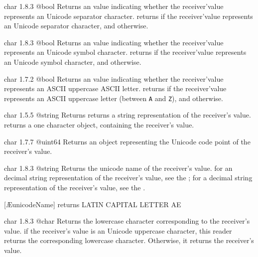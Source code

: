 {char}
{1.8.3}
{@bool}
{Returns an  value indicating whether the receiver'value represents an Unicode separator character.}
{returns  if the receiver'value represents an Unicode separator character, and  otherwise.}






{char}
{1.8.3}
{@bool}
{Returns an  value indicating whether the receiver'value represents an Unicode symbol character.}
{returns  if the receiver'value represents an Unicode symbol character, and  otherwise.}









{char}
{1.7.2}
{@bool}
{Returns an  value indicating whether the receiver'value represents an ASCII uppercase ASCII letter.}
{returns  if the receiver'value represents an ASCII uppercase letter (between \texttt{\textquotesingle A\textquotesingle} and \texttt{\textquotesingle Z\textquotesingle}), and  otherwise.}





{char}
{1.5.5}
{@string}
{Returns returns a string representation of the receiver's value.}
{returns a one character  object, containing the receiver's value.}




{char}
{1.7.7}
{@uint64}
{Returns an  object representing the Unicode code point of the receiver's value.}
{}




{char}
{1.8.3}
{@string}
{Returns the unicode name of the receiver's value.}
{for an decimal string representation of the receiver's value, see the ; for a decimal string representation of the receiver's value, see the .}

\exempleUneLigne
{}
{[\textquotesingle \AE \textquotesingle unicodeName] returns \textquotedbl LATIN CAPITAL LETTER AE \textquotedbl}




{char}
{1.8.3}
{@char}
{Returns the lowercase character corresponding to the receiver's value.}
{if the receiver's value is an Unicode uppercase character, this reader returns the corresponding lowercase character. Otherwise, it returns the receiver's value.}

